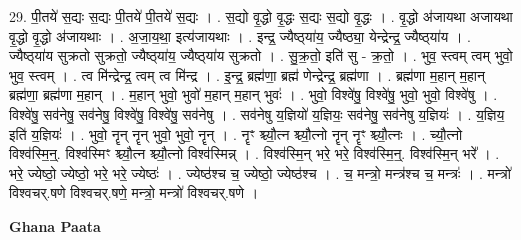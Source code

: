 \documentclass[17pt]{extarticle}
\begin{document}
29. पी॒तये॑ स॒द्यः स॒द्यः पी॒तये॑ पी॒तये॑ स॒द्यः । . स॒द्यो वृ॒द्धो वृ॒द्धः स॒द्यः स॒द्यो वृ॒द्धः । . वृ॒द्धो अ॑जायथा अजायथा वृ॒द्धो वृ॒द्धो अ॑जायथाः । . अ॒जा॒य॒था॒ इत्य॑जायथाः । . इन्द्र॒ ज्यैष्ठ्‌या॑य॒ ज्यैष्ठ्या॒ येन्द्रेन्द्र॒ ज्यैष्ठ्‌या॑य । . ज्यैष्ठ्‌या॑य सुक्रतो सुक्रतो॒ ज्यैष्ठ्‌या॑य॒ ज्यैष्ठ्‌या॑य सुक्रतो । . सु॒क्र॒तो॒ इति॑ सु - क्र॒तो॒ । . भुव॒ स्त्वम् त्वम् भुवो॒ भुव॒ स्त्वम् । . त्व मि॑न्द्रेन्द्र॒ त्वम् त्व मि॑न्द्र । . इ॒न्द्र॒ ब्रह्म॑णा॒ ब्रह्म॑ णेन्द्रेन्द्र॒ ब्रह्म॑णा । . ब्रह्म॑णा म॒हान् म॒हान् ब्रह्म॑णा॒ ब्रह्म॑णा म॒हान् । . म॒हान् भुवो॒ भुवो॑ म॒हान् म॒हान् भुवः॑ । . भुवो॒ विश्वे॑षु॒ विश्वे॑षु॒ भुवो॒ भुवो॒ विश्वे॑षु । . विश्वे॑षु॒ सव॑नेषु॒ सव॑नेषु॒ विश्वे॑षु॒ विश्वे॑षु॒ सव॑नेषु । . सव॑नेषु य॒ज्ञियो॑ य॒ज्ञियः॒ सव॑नेषु॒ सव॑नेषु य॒ज्ञियः॑ । . य॒ज्ञिय॒ इति॑ य॒ज्ञियः॑ । . भुवो॒ नॄन् नॄन् भुवो॒ भुवो॒ नॄन् । . नॄꣳ श्च्यौ॒त्न श्च्यौ॒त्नो नॄन् नॄꣳ श्च्यौ॒त्नः । . च्यौ॒त्नो विश्व॑स्मि॒न्॒. विश्व॑स्मिꣳ श्च्यौ॒त्न श्च्यौ॒त्नो विश्व॑स्मिन्न् । . विश्व॑स्मि॒न् भरे॒ भरे॒ विश्व॑स्मि॒न्॒. विश्व॑स्मि॒न् भरे᳚ । . भरे॒ ज्येष्ठो॒ ज्येष्ठो॒ भरे॒ भरे॒ ज्येष्ठः॑ । . ज्येष्ठ॑श्च च॒ ज्येष्ठो॒ ज्येष्ठ॑श्च । . च॒ मन्त्रो॒ मन्त्र॑श्च च॒ मन्त्रः॑ । . मन्त्रो॑ विश्वचर्.षणे विश्वचर्.षणे॒ मन्त्रो॒ मन्त्रो॑ विश्वचर्.षणे । \newline

\textbf{Ghana Paata } \newline
\end{document}
